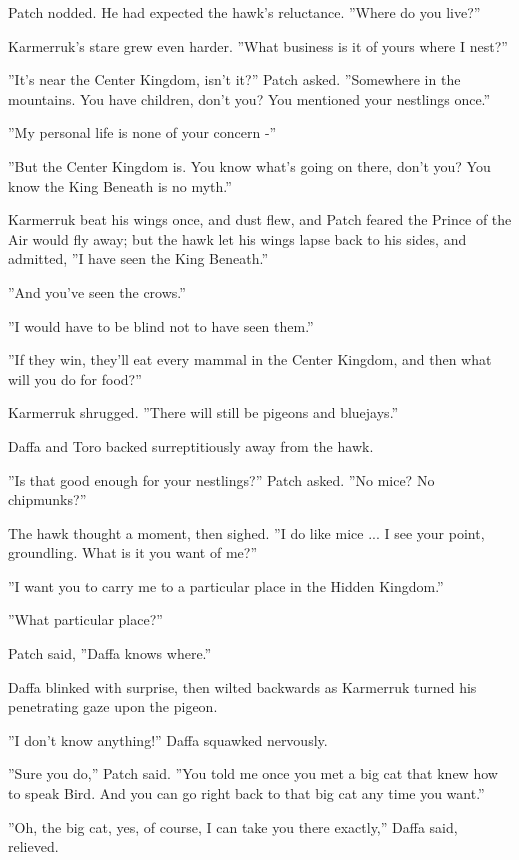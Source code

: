 \documentclass[11pt]{article}
\begin{document}
 Patch nodded. He had expected the hawk's reluctance. ''Where do you live?''\par
 Karmerruk's stare grew even harder. ''What business is it of yours where I nest?''\par
 ''It's near the Center Kingdom, isn't it?'' Patch asked. ''Somewhere in the mountains. You have children, don't you? You mentioned your nestlings once.''\par
 ''My personal life is none of your concern -''\par
 ''But the Center Kingdom is. You know what's going on there, don't you? You know the King Beneath is no myth.''\par
 Karmerruk beat his wings once, and dust flew, and Patch feared the Prince of the Air would fly away; but the hawk let his wings lapse back to his sides, and admitted, ''I have seen the King Beneath.''\par
 ''And you've seen the crows.''\par
 ''I would have to be blind not to have seen them.''\par
 ''If they win, they'll eat every mammal in the Center Kingdom, and then what will you do for food?''\par
 Karmerruk shrugged. ''There will still be pigeons and bluejays.''\par
 Daffa and Toro backed surreptitiously away from the hawk.\par
 ''Is that good enough for your nestlings?'' Patch asked. ''No mice? No chipmunks?''\par
 The hawk thought a moment, then sighed. ''I do like mice ... I see your point, groundling. What is it you want of me?''\par
 ''I want you to carry me to a particular place in the Hidden Kingdom.''\par
 ''What particular place?''\par
 Patch said, ''Daffa knows where.''\par
 Daffa blinked with surprise, then wilted backwards as Karmerruk turned his penetrating gaze upon the pigeon.\par
''I don't know anything!'' Daffa squawked nervously.\par
 ''Sure you do,'' Patch said. ''You told me once you met a big cat that knew how to speak Bird. And you can go right back to that big cat any time you want.''\par
 ''Oh, the big cat, yes, of course, I can take you there exactly,'' Daffa said, relieved.\par
\end{document}
